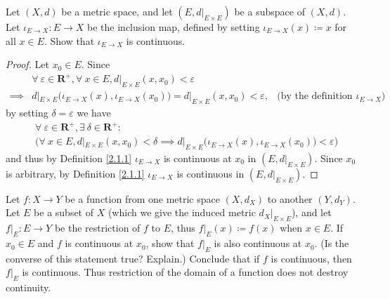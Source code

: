 \begin{exercise}\label{ex 2.1.5}
    Let \((X, d)\) be a metric space, and let \((E, d|_{E \times E})\) be a subspace of \((X, d)\).
    Let \(\iota_{E \to X} : E \to X\) be the inclusion map, defined by setting \(\iota_{E \to X}(x) \coloneqq x\) for all \(x \in E\).
    Show that \(\iota_{E \to X}\) is continuous.
\end{exercise}

\begin{proof}
    Let \(x_0 \in E\).
    Since
    \begin{align*}
                 & \forall\ \varepsilon \in \mathbf{R}^+, \forall\ x \in E, d|_{E \times E}(x, x_0) < \varepsilon                                                                 \\
        \implies & d|_{E \times E}\big(\iota_{E \to X}(x), \iota_{E \to X}(x_0)\big) = d|_{E \times E}(x, x_0) < \varepsilon, & \text{(by the definition of \(\iota_{E \to X}\))}
    \end{align*}
    by setting \(\delta = \varepsilon\) we have
    \begin{align*}
         & \forall\ \varepsilon \in \mathbf{R}^+, \exists\ \delta \in \mathbf{R}^+ :                                                                             \\
         & \Big(\forall\ x \in E, d|_{E \times E}(x, x_0) < \delta \implies d|_{E \times E}\big(\iota_{E \to X}(x), \iota_{E \to X}(x_0)\big) < \varepsilon\Big)
    \end{align*}
    and thus by Definition \ref{2.1.1} \(\iota_{E \to X}\) is continuous at \(x_0\) in \((E, d|_{E \times E})\).
    Since \(x_0\) is arbitrary, by Definition \ref{2.1.1} \(\iota_{E \to X}\) is continuous in \((E, d|_{E \times E})\).
\end{proof}

\begin{exercise}\label{ex 2.1.6}
    Let \(f : X \to Y\) be a function from one metric space \((X, d_X)\) to another \((Y, d_Y)\).
    Let \(E\) be a subset of \(X\) (which we give the induced metric \(d_X|_{E \times E}\)), and let \(f|_E : E \to Y\) be the restriction of \(f\) to \(E\), thus \(f|_E(x) \coloneqq f(x)\) when \(x \in E\).
    If \(x_0 \in E\) and \(f\) is continuous at \(x_0\), show that \(f|_E\) is also continuous at \(x_0\).
    (Is the converse of this statement true? Explain.)
    Conclude that if \(f\) is continuous, then \(f|_E\) is continuous.
    Thus restriction of the domain of a function does not destroy continuity.
\end{exercise}

